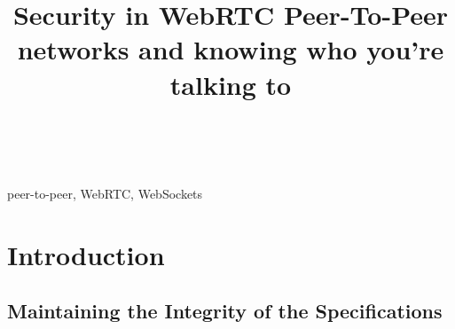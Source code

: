\documentclass[conference]{IEEEtran}
\begin{document}
\title{Security in WebRTC Peer-To-Peer networks and knowing who you're talking to\\
}

\author{
 \\
\textit{}
}

\maketitle

\begin{abstract}
\end{abstract}

\begin{IEEEkeywords}
peer-to-peer, WebRTC, WebSockets
\end{IEEEkeywords}

\section{Introduction}

\subsection{Maintaining the Integrity of the Specifications}

\begin{thebibliography}{00}
\end{thebibliography}
\end{document}
